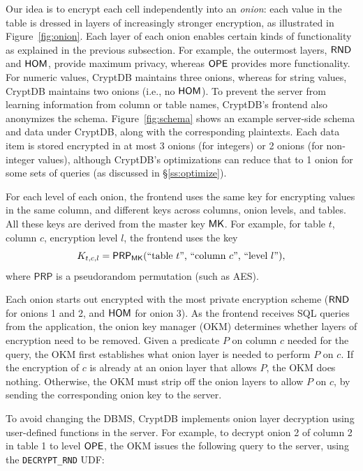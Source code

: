 Our idea is to encrypt each cell independently into an \textit{onion}:
each value in the table is dressed in layers of increasingly stronger
encryption, as illustrated in Figure~\ref{fig:onion}. Each layer of
each onion enables certain kinds of functionality as explained in the
previous subsection.  For example, the outermost layers, $\mathsf{RND}$ and
$\mathsf{HOM}$, provide maximum privacy, whereas $\mathsf{OPE}$ provides more
functionality.  For numeric values, CryptDB maintains three onions,
whereas for string values, CryptDB maintains two onions (i.e.,
no $\mathsf{HOM}$)\@.  To prevent the server from learning information from
column or table names, CryptDB's frontend also anonymizes the schema.
Figure~\ref{fig:schema} shows an example server-side schema and data
under CryptDB, along with the corresponding plaintexts.  Each data
item is stored encrypted in at most 3 onions (for integers) or 2
onions (for non-integer values), although CryptDB's optimizations
can reduce that to 1 onion for some sets of queries (as discussed
in \S\ref{ss:optimize}).

For each level of each onion, the frontend uses the same key for
encrypting values in the same column, and different keys across
columns, onion levels, and tables.  All these keys are derived
from the master key $\mathsf{MK}$\@.  For example, for table $t$, column
$c$, encryption level $l$, the frontend uses the key
\begin{equation}\label{eq:columnkey}
K_{t, c, l} = \mathsf{PRP}_{\mathsf{MK}} (\text{``table $t$'', ``column $c$'', ``level
$l$''}),
\end{equation}
where $\mathsf{PRP}$ is a pseudorandom permutation (such as AES).

Each onion starts out encrypted with the most private encryption scheme
($\mathsf{RND}$ for onions 1 and 2, and $\mathsf{HOM}$ for onion 3)\@.  As the frontend
receives SQL queries from the
application, the onion key manager (OKM) determines whether layers of
encryption need to be removed.  Given a predicate $P$ on column $c$
needed for the query, the OKM first establishes what onion layer is
needed to perform $P$ on $c$.  If the encryption of $c$ is already at
an onion layer that allows $P$, the OKM does nothing.  Otherwise,
the OKM must strip off the onion layers to allow $P$ on $c$, by
sending the corresponding onion key to the server.

To avoid changing the DBMS, CryptDB implements onion layer decryption
using user-defined functions in the server.  For example, to decrypt
onion 2 of column 2 in table 1 to level $\mathsf{OPE}$, the OKM issues the
following query to the server, using the {\tt DECRYPT\_RND} UDF:

